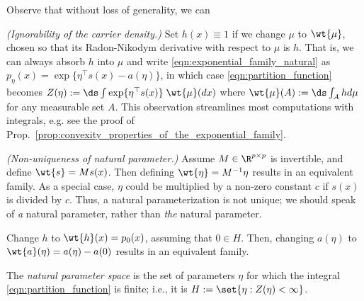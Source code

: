 \documentclass{article} %
\newcommand{\normalizerFunction}{Z}
\newcommand{\logNormalizerFunction}{a}
\newcommand{\sufficientStatsFunction}{s}
\newcommand{\carrierDensity}{h}
\newcommand{\naturalParam}{\eta}
\newcommand{\naturalParamSpace}{H}
\begin{document}
\begin{remark}
Observe \cite{chua2019stats} that without loss of generality, we can 
\begin{alphabate} 
\item \label{item:ignorabiity_of_carrier_density} \textit{(Ignorability of the carrier density.)} Set $\carrierDensity(x) \equiv 1$ if we change $\mu$ to $\wt{\mu}$, chosen so that its Radon-Nikodym derivative with respect to $\mu$ is $\carrierDensity$. That is, we can always absorb $\carrierDensity$ into $\mu$ and write \eqref{eqn:exponential_family_natural} as  $p_\naturalParam(x) = \exp \{ \naturalParam^\top \sufficientStatsFunction(x) - \logNormalizerFunction(\naturalParam)\}$, in which case \eqref{eqn:partition_function} becomes $\normalizerFunction(\naturalParam) := \ds\int  \exp \{ \naturalParam^\top \sufficientStatsFunction(x)  \} \; \wt{\mu} (dx) $ where $\wt{\mu}(A) := \ds\int_A \carrierDensity d\mu$ for any measurable set $A$.   This observation streamlines most computations with integrals, e.g. see the proof of Prop.~\ref{prop:convexity_properties_of_the_exponential_family}. 
\item \label{item:nonuniqueness_of_natural_parameter} \textit{(Non-uniqueness of natural parameter.)} Assume $M \in \R^{p \times p}$ is invertible, and define $\wt{\sufficientStatsFunction} = M \sufficientStatsFunction(x)$. Then defining $\wt{\naturalParam} = M^{-1} \naturalParam$ results in an equivalent family.  As a special case, $\naturalParam$ could be multiplied by a non-zero constant $c$ if $\sufficientStatsFunction(x)$ is divided by $c$.  Thus, a natural parameterization is not unique; we should speak of \textit{a} natural parameter,  rather than \textit{the} natural parameter.
\item Change $\carrierDensity$ to $\wt{\carrierDensity}(x) = p_0(x)$, assuming that $0 \in \naturalParamSpace$.  Then, changing $\logNormalizerFunction(\naturalParam)$ to $\wt{\logNormalizerFunction}(\naturalParam) = \logNormalizerFunction(\naturalParam) - \logNormalizerFunction(0)$ results in an equivalent family. 
\end{alphabate}
\label{rk:alternate_constructions_for_the_exponential_family}
\end{remark}


\begin{definition}
The \textit{natural parameter space} is the set of parameters $\naturalParam$ for which the integral \eqref{eqn:partition_function} is finite; i.e., it is $\naturalParamSpace:=\set{\naturalParam : \normalizerFunction(\naturalParam) < \infty}$.
\end{definition}
\end{document}
